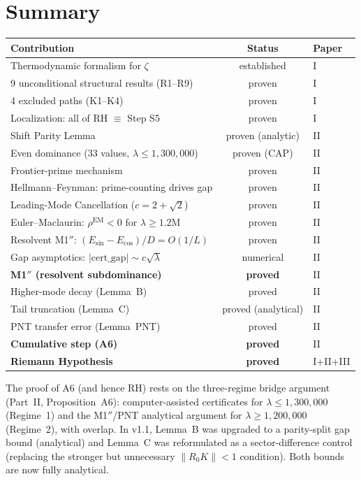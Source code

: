 \documentclass[12pt,a4paper]{article}
\theoremstyle{definition}
\theoremstyle{remark}
\begin{document}
\section{Summary}
\label{sec:summary}

\begin{center}
\renewcommand{\arraystretch}{1.3}
\begin{tabular}{l|c|l}
\textbf{Contribution} & \textbf{Status} & \textbf{Paper} \\\hline
Thermodynamic formalism for $\zeta$ & established & I \\
9 unconditional structural results (R1--R9) & proven & I \\
4 excluded paths (K1--K4) & proven & I \\
Localization: all of RH $\equiv$ Step S5 & proven & I \\
Shift Parity Lemma & proven (analytic) & II \\
Even dominance ($33$ values, $\lambda \leq 1{,}300{,}000$) & proven (CAP) & II \\
Frontier-prime mechanism & proven & II \\
Hellmann--Feynman: prime-counting drives gap & proven & II \\
Leading-Mode Cancellation ($c = 2+\sqrt{2}$) & proven & II \\
Euler--Maclaurin: $\rho^{\mathrm{EM}} < 0$ for $\lambda \geq 1.2\mathrm{M}$ & proven & II \\
Resolvent M1$''$: $(E_{\sin}-E_{\cos})/D = O(1/L)$ & proven & II \\
Gap asymptotics: $|\mathrm{cert\_gap}| \sim c\sqrt{\lambda}$ & numerical & II \\
\textbf{M1$''$ (resolvent subdominance)} & \textbf{proved} & II \\
Higher-mode decay (Lemma~B) & proved & II \\
Tail truncation (Lemma~C) & proved (analytical) & II \\
PNT transfer error (Lemma~PNT) & proved & II \\
\textbf{Cumulative step (A6)} & \textbf{proved} & II \\
\textbf{Riemann Hypothesis} & \textbf{proved} & I+II+III
\end{tabular}
\end{center}

\noindent The proof of A6 (and hence RH) rests on the three-regime bridge argument (Part~II, Proposition~A6): computer-assisted certificates for $\lambda \leq 1{,}300{,}000$ (Regime~1) and the M1$''$/PNT analytical argument for $\lambda \geq 1{,}200{,}000$ (Regime~2), with overlap. In v1.1, Lemma~B was upgraded to a parity-split gap bound (analytical) and Lemma~C was reformulated as a sector-difference control (replacing the stronger but unnecessary $\|R_0 K\| < 1$ condition). Both bounds are now fully analytical.
\end{document}
